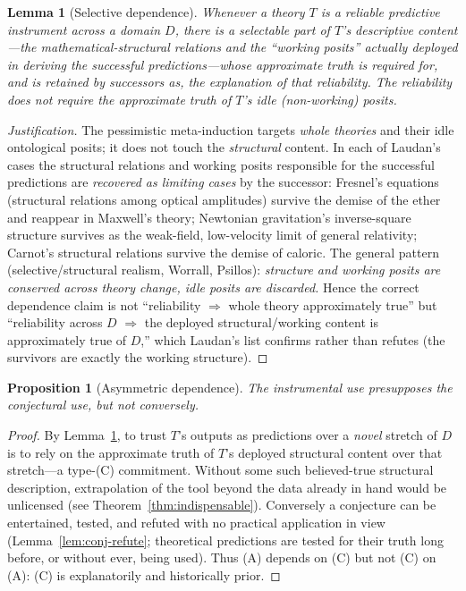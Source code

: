 \documentclass{amsart}
\theoremstyle{definition}
\theoremstyle{plain}
\newtheorem{lemma}{Lemma}
\newtheorem{proposition}{Proposition}
\begin{document}
\begin{lemma}[Selective dependence]\label{lem:selective}
Whenever a theory $T$ is a reliable predictive instrument across a domain
$D$, there is a \emph{selectable} part of $T$'s descriptive content---the
mathematical-structural relations and the ``working posits'' actually deployed
in deriving the successful predictions---whose \emph{approximate truth} is
required for, and is retained by successors as, the explanation of that
reliability. The reliability does not require the approximate truth of $T$'s
\emph{idle} (non-working) posits.
\end{lemma}

\begin{proof}[Justification]
The pessimistic meta-induction targets \emph{whole theories} and their idle
ontological posits; it does not touch the \emph{structural} content. In each of
Laudan's cases the structural relations and working posits responsible for the
successful predictions are \emph{recovered as limiting cases} by the successor:
Fresnel's equations (structural relations among optical amplitudes) survive the
demise of the ether and reappear in Maxwell's theory; Newtonian gravitation's
inverse-square structure survives as the weak-field, low-velocity limit of
general relativity; Carnot's structural relations survive the demise of
caloric. The general pattern (selective/structural realism, Worrall, Psillos):
\emph{structure and working posits are conserved across theory change, idle
posits are discarded.} Hence the correct dependence claim is not ``reliability
$\Rightarrow$ whole theory approximately true'' but ``reliability across $D$
$\Rightarrow$ the deployed structural/working content is approximately true of
$D$,'' which Laudan's list confirms rather than refutes (the survivors are
exactly the working structure).
\end{proof}

\begin{proposition}[Asymmetric dependence]\label{prop:depend}
The instrumental use presupposes the conjectural use, but not conversely.
\end{proposition}

\begin{proof}
By Lemma~\ref{lem:selective}, to trust $T$'s outputs as predictions over a
\emph{novel} stretch of $D$ is to rely on the approximate truth of $T$'s
deployed structural content over that stretch---a type-(C) commitment. Without
some such believed-true structural description, extrapolation of the tool beyond
the data already in hand would be unlicensed (see
Theorem~\ref{thm:indispensable}). Conversely a conjecture can be entertained,
tested, and refuted with no practical application in view
(Lemma~\ref{lem:conj-refute}; theoretical predictions are tested for their
truth long before, or without ever, being used). Thus (A) depends on (C) but not
(C) on (A): (C) is explanatorily and historically prior.
\end{proof}
\end{document}
